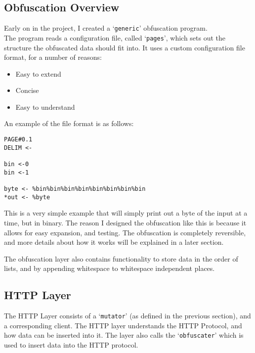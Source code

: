 \subsection{Obfuscation Overview}
Early on in the project, I created a `\texttt{generic}' obfuscation program.\\
The program reads a configuration file, called `\texttt{pages}', which sets out the structure the obfuscated data should fit into. It uses a custom configuration file format, for a number of reasons:
\begin{itemize}
    \item Easy to extend
    \item Concise
    \item Easy to understand
\end{itemize}
An example of the file format is as follows:
\begin{verbatim}
PAGE#0.1
DELIM <-

bin <-0
bin <-1 

byte <- %bin%bin%bin%bin%bin%bin%bin%bin
*out <- %byte
\end{verbatim}
This is a very simple example that will simply print out a byte of the input at a time, but in binary.
The reason I designed the obfuscation like this is because it allows for easy expansion, and testing.
The obfuscation is completely reversible, and more details about how it works will be explained in a later section.\par
The obfuscation layer also contains functionality to store data in the order of lists, and by appending whitespace to whitespace independent places.

\subsection{HTTP Layer}
The HTTP Layer consists of a `\texttt{mutator}' (as defined in the previous section), and a corresponding client. The HTTP layer understands the HTTP Protocol, and how data can be inserted into it.
The layer also calls the `\texttt{obfuscater}' which is used to insert data into the HTTP protocol.

